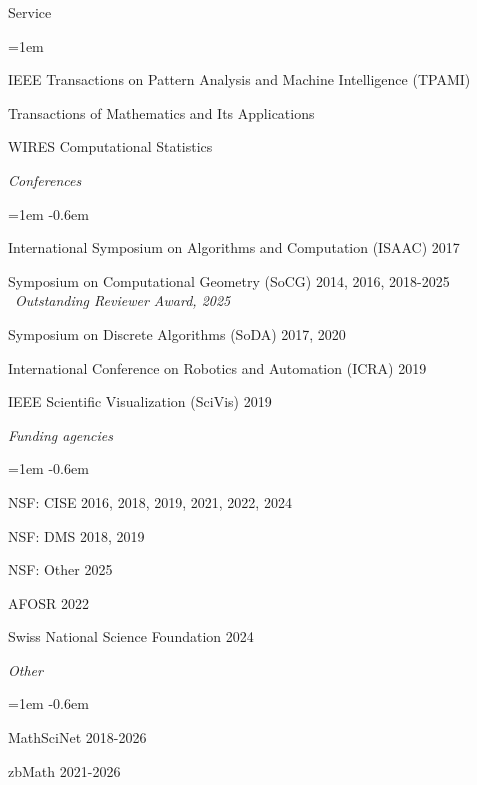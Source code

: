 \documentclass{resume} %
\begin{document}
\begin{rSection}{Service}
\begin{list}{}{\leftmargin=1em}
   \item IEEE Transactions on Pattern Analysis and Machine Intelligence (TPAMI) %
   \item Transactions of Mathematics and Its Applications %
   \item WIRES Computational Statistics %
\end{list}
\textit{Conferences}
\begin{list}{}{\leftmargin=1em}
   \itemsep -0.6em \vspace{-0.5em} %
   \item International Symposium on Algorithms and Computation (ISAAC) \hfill 2017
   \item Symposium on Computational Geometry (SoCG) \hfill 2014, 2016, 2018-2025\\\
   \phantom{XXX}\textit{Outstanding Reviewer Award, 2025}
   \item Symposium on Discrete Algorithms (SoDA) \hfill 2017, 2020
   \item International Conference on Robotics and Automation (ICRA) \hfill 2019
   \item IEEE Scientific Visualization (SciVis) \hfill 2019
\end{list}
\textit{Funding agencies}
\begin{list}{}{\leftmargin=1em}
   \itemsep -0.6em \vspace{-0.5em} %
   \item NSF: CISE  \hfill 2016, 2018, 2019, 2021, 2022, 2024
   \item NSF: DMS \hfill 2018, 2019
   \item NSF: Other \hfill 2025
   \item AFOSR \hfill 2022
   \item Swiss National Science Foundation \hfill 2024
\end{list}
\textit{Other}
\begin{list}{}{\leftmargin=1em}
   \itemsep -0.6em \vspace{-0.5em} %
   \item MathSciNet \hfill 2018-2026
   \item zbMath \hfill 2021-2026
\end{list}

\end{rSection}
\end{document}
